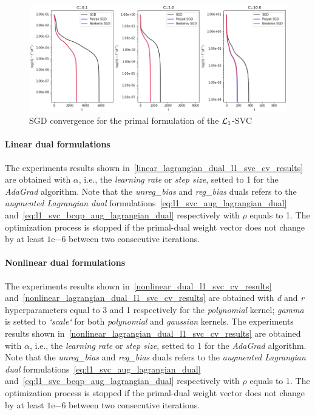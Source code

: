 \begin{figure}[H]
	\centering
	\includegraphics[scale=0.55]{img/l1_svc_loss_history}
	\caption{SGD convergence for the primal formulation of the $\protect \mathcal{L}_1$-SVC}
	\label{fig:l1_svc_history}
\end{figure}

\paragraph{Linear dual formulations}

The experiments results shown in~\ref{linear_lagrangian_dual_l1_svc_cv_results} are obtained with $\alpha$, i.e., the \emph{learning rate} or \emph{step size}, setted to 1 for the \emph{AdaGrad} algorithm. Note that the \emph{unreg\_bias} and \emph{reg\_bias} duals refers to the \emph{augmented Lagrangian dual} formulations~\eqref{eq:l1_svc_aug_lagrangian_dual} and~\eqref{eq:l1_svc_bcqp_aug_lagrangian_dual} respectively with $\rho$ equals to 1. The optimization process is stopped if the primal-dual weight vector does not change by at least $1\mathrm{e}{-6}$  between two consecutive iterations.





\paragraph{Nonlinear dual formulations}

The experiments results shown in~\ref{nonlinear_dual_l1_svc_cv_results} and~\ref{nonlinear_lagrangian_dual_l1_svc_cv_results} are obtained with \emph{d} and \emph{r} hyperparameters equal to 3 and 1 respectively for the \emph{polynomial} kernel; \emph{gamma} is setted to \emph{`scale`} for both \emph{polynomial} and \emph{gaussian} kernels. The experiments results shown in~\ref{nonlinear_lagrangian_dual_l1_svc_cv_results} are obtained with $\alpha$, i.e., the \emph{learning rate} or \emph{step size}, setted to 1 for the \emph{AdaGrad} algorithm. Note that the \emph{unreg\_bias} and \emph{reg\_bias} duals refers to the \emph{augmented Lagrangian dual} formulations~\eqref{eq:l1_svc_aug_lagrangian_dual} and~\eqref{eq:l1_svc_bcqp_aug_lagrangian_dual} respectively with $\rho$ equals to 1. The optimization process is stopped if the primal-dual weight vector does not change by at least $1\mathrm{e}{-6}$  between two consecutive iterations.

